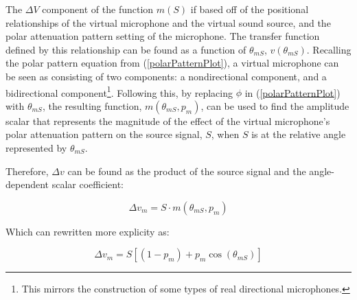 The $\Delta{}V$ component of the function $m(S)$ if based off of the positional relationships of the virtual microphone and the virtual sound source, and the polar attenuation pattern setting of the microphone. The transfer function defined by this relationship can be found as a function of $\theta_{mS}$, $v(\theta_{mS})$. Recalling the polar pattern equation from (\ref{polarPatternPlot}), a virtual microphone can be seen as consisting of two components: a nondirectional component, and a bidirectional component\footnote{This mirrors the construction of some types of real directional microphones.}. Following this, by replacing $\phi$ in (\ref{polarPatternPlot}) with $\theta_{mS}$, the resulting function, $m(\theta_{mS}, p_m)$, can be used to find the amplitude scalar that represents the magnitude of the effect of the virtual microphone's polar attenuation pattern on the source signal, $S$, when $S$ is at the relative angle represented by $\theta_{mS}$.

Therefore, $\Delta{}v$ can be found as the product of the source signal and the angle-dependent scalar coefficient:

\begin{equation}
\Delta{}v_m = S \cdot m(\theta_{mS}, p_m)
\end{equation}

Which can rewritten more explicity as:

\begin{equation}
\Delta{}v_m = S\left[ \left(1 - p_m\right) + p_m\cos(\theta_{mS}) \right]
\end{equation}
